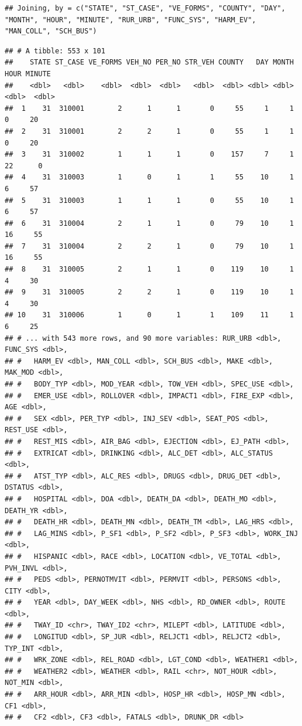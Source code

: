 \documentclass[]{book}
\newenvironment{Shaded}{\begin{snugshade}}{\end{snugshade}}
\newcommand{\KeywordTok}[1]{\textcolor[rgb]{0.13,0.29,0.53}{\textbf{#1}}}
\newcommand{\NormalTok}[1]{#1}
\newcommand{\OperatorTok}[1]{\textcolor[rgb]{0.81,0.36,0.00}{\textbf{#1}}}
\newcommand{\StringTok}[1]{\textcolor[rgb]{0.31,0.60,0.02}{#1}}
\begin{document}
\begin{Shaded}
\end{Shaded}

\begin{verbatim}
## Joining, by = c("STATE", "ST_CASE", "VE_FORMS", "COUNTY", "DAY", "MONTH", "HOUR", "MINUTE", "RUR_URB", "FUNC_SYS", "HARM_EV", "MAN_COLL", "SCH_BUS")
\end{verbatim}

\begin{verbatim}
## # A tibble: 553 x 101
##    STATE ST_CASE VE_FORMS VEH_NO PER_NO STR_VEH COUNTY   DAY MONTH  HOUR MINUTE
##    <dbl>   <dbl>    <dbl>  <dbl>  <dbl>   <dbl>  <dbl> <dbl> <dbl> <dbl>  <dbl>
##  1    31  310001        2      1      1       0     55     1     1     0     20
##  2    31  310001        2      2      1       0     55     1     1     0     20
##  3    31  310002        1      1      1       0    157     7     1    22      0
##  4    31  310003        1      0      1       1     55    10     1     6     57
##  5    31  310003        1      1      1       0     55    10     1     6     57
##  6    31  310004        2      1      1       0     79    10     1    16     55
##  7    31  310004        2      2      1       0     79    10     1    16     55
##  8    31  310005        2      1      1       0    119    10     1     4     30
##  9    31  310005        2      2      1       0    119    10     1     4     30
## 10    31  310006        1      0      1       1    109    11     1     6     25
## # ... with 543 more rows, and 90 more variables: RUR_URB <dbl>, FUNC_SYS <dbl>,
## #   HARM_EV <dbl>, MAN_COLL <dbl>, SCH_BUS <dbl>, MAKE <dbl>, MAK_MOD <dbl>,
## #   BODY_TYP <dbl>, MOD_YEAR <dbl>, TOW_VEH <dbl>, SPEC_USE <dbl>,
## #   EMER_USE <dbl>, ROLLOVER <dbl>, IMPACT1 <dbl>, FIRE_EXP <dbl>, AGE <dbl>,
## #   SEX <dbl>, PER_TYP <dbl>, INJ_SEV <dbl>, SEAT_POS <dbl>, REST_USE <dbl>,
## #   REST_MIS <dbl>, AIR_BAG <dbl>, EJECTION <dbl>, EJ_PATH <dbl>,
## #   EXTRICAT <dbl>, DRINKING <dbl>, ALC_DET <dbl>, ALC_STATUS <dbl>,
## #   ATST_TYP <dbl>, ALC_RES <dbl>, DRUGS <dbl>, DRUG_DET <dbl>, DSTATUS <dbl>,
## #   HOSPITAL <dbl>, DOA <dbl>, DEATH_DA <dbl>, DEATH_MO <dbl>, DEATH_YR <dbl>,
## #   DEATH_HR <dbl>, DEATH_MN <dbl>, DEATH_TM <dbl>, LAG_HRS <dbl>,
## #   LAG_MINS <dbl>, P_SF1 <dbl>, P_SF2 <dbl>, P_SF3 <dbl>, WORK_INJ <dbl>,
## #   HISPANIC <dbl>, RACE <dbl>, LOCATION <dbl>, VE_TOTAL <dbl>, PVH_INVL <dbl>,
## #   PEDS <dbl>, PERNOTMVIT <dbl>, PERMVIT <dbl>, PERSONS <dbl>, CITY <dbl>,
## #   YEAR <dbl>, DAY_WEEK <dbl>, NHS <dbl>, RD_OWNER <dbl>, ROUTE <dbl>,
## #   TWAY_ID <chr>, TWAY_ID2 <chr>, MILEPT <dbl>, LATITUDE <dbl>,
## #   LONGITUD <dbl>, SP_JUR <dbl>, RELJCT1 <dbl>, RELJCT2 <dbl>, TYP_INT <dbl>,
## #   WRK_ZONE <dbl>, REL_ROAD <dbl>, LGT_COND <dbl>, WEATHER1 <dbl>,
## #   WEATHER2 <dbl>, WEATHER <dbl>, RAIL <chr>, NOT_HOUR <dbl>, NOT_MIN <dbl>,
## #   ARR_HOUR <dbl>, ARR_MIN <dbl>, HOSP_HR <dbl>, HOSP_MN <dbl>, CF1 <dbl>,
## #   CF2 <dbl>, CF3 <dbl>, FATALS <dbl>, DRUNK_DR <dbl>
\end{verbatim}
\end{document}
